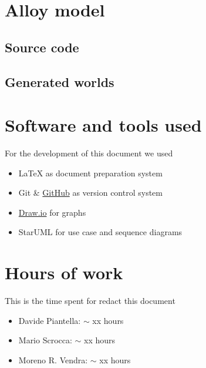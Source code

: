 \begin{appendices}

	\section{Alloy model}
		\subsection{Source code}
		
		\subsection{Generated worlds}
	\section{Software and tools used}
	For the development of this document we used
	\begin{itemize}
		\item \LaTeX{} as document preparation system
		\item Git \& \href{http://github.com}{GitHub} as version control system
		\item \href{http://draw.io}{Draw.io} for graphs
		\item StarUML for use case and sequence diagrams
	\end{itemize}
	
	\section{Hours of work}
	This is the time spent for redact this document
	\begin{itemize}
		\item Davide Piantella: $\sim$ xx hours
		\item Mario Scrocca: $\sim$ xx hours
		\item Moreno R. Vendra: $\sim$ xx hours
	\end{itemize}
\end{appendices}